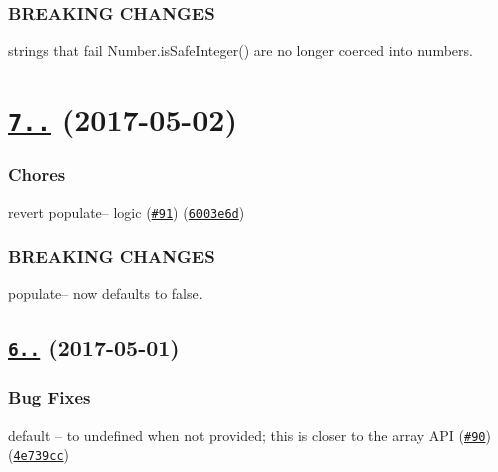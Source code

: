 \subsubsection*{B\+R\+E\+A\+K\+I\+NG C\+H\+A\+N\+G\+ES}


\begin{DoxyItemize}
\item strings that fail {\ttfamily Number.\+is\+Safe\+Integer()} are no longer coerced into numbers.
\end{DoxyItemize}

\label{_7.0.0}%
 \section*{\href{https://github.com/yargs/yargs-parser/compare/v6.0.1...v7.0.0}{\tt 7..} (2017-\/05-\/02)}

\subsubsection*{Chores}


\begin{DoxyItemize}
\item revert populate-- logic (\href{https://github.com/yargs/yargs-parser/issues/91}{\tt \#91}) (\href{https://github.com/yargs/yargs-parser/commit/6003e6d}{\tt 6003e6d})
\end{DoxyItemize}

\subsubsection*{B\+R\+E\+A\+K\+I\+NG C\+H\+A\+N\+G\+ES}


\begin{DoxyItemize}
\item populate-- now defaults to false.
\end{DoxyItemize}

\label{_6.0.1}%
 \subsection*{\href{https://github.com/yargs/yargs-parser/compare/v6.0.0...v6.0.1}{\tt 6..} (2017-\/05-\/01)}

\subsubsection*{Bug Fixes}


\begin{DoxyItemize}
\item default \textquotesingle{}--\textquotesingle{} to undefined when not provided; this is closer to the array A\+PI (\href{https://github.com/yargs/yargs-parser/issues/90}{\tt \#90}) (\href{https://github.com/yargs/yargs-parser/commit/4e739cc}{\tt 4e739cc})
\end{DoxyItemize}

